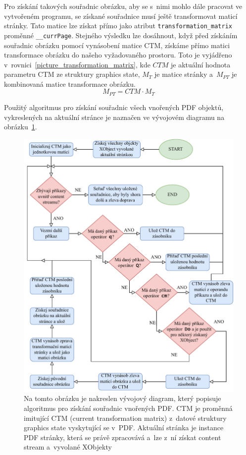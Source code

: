 Pro získání takových souřadnic obrázku, aby se s~nimi mohlo dále pracovat
ve vytvořeném programu, se získané souřadnice musí ještě transformovat
maticí stránky. Tato matice lze získat přímo jako atribut
\texttt{transformation\_matrix} proměnné \texttt{\_\_currPage}.
Stejného výsledku lze dosáhnout, když před získáním souřadnic obrázku pomocí
vynásobení matice CTM, získáme přímo matici transformace obrázku do našeho
vyžadovaného prostoru. Toto je vyjádřeno
v~rovnici~\eqref{picture_transformation_matrix}, kde $CTM$ je aktuální hodnota
parametru CTM ze struktury graphics state, $M_T$ je matice stránky a~$M_{PT}$
je kombinovaná matice transformace obrázku.
\begin{equation} \label{picture_transformation_matrix}
    M_{PT} = CTM \cdot M_{T}
\end{equation}

Použitý algoritmus pro získání souřadnic všech vnořených PDF objektů,
vykreslených na aktuální stránce je naznačen ve vývojovém diagramu na
obrázku~\ref{pic_embedded_pdf_flow_chart}.

\begin{figure}[H]
    \centering
    \includegraphics[width=\linewidth]{obrazky-figures/embedded_pdf_flow_chart.pdf}
    \caption{
        Na tomto obrázku je nakreslen vývojový diagram, který popisuje
        algoritmus pro získání souřadnic vnořených PDF. CTM je proměnná imitující 
        CTM (current transformation matrix) z~datové struktury graphics state
        vyskytující se v~PDF. Aktuální stránka je instance PDF stránky, která
        se právě zpracovává a~lze z~ní získat content stream a~vyvolané XObjekty
    }
    \label{pic_embedded_pdf_flow_chart}
\end{figure}


